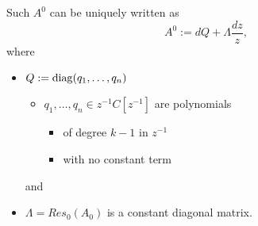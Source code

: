 \begin{paracol}{2}
\begin{defn}
    \begin{rem}
      Such $A^0$ can be uniquely written as
      \[
        A^0:= dQ + \Lambda \frac{dz}{z},
      \]
      where
      \begin{itemize}
        \item $Q := \operatorname{diag}(q_1,\dots ,q_n)$
          \begin{itemize}
            \item $q_1,\dots ,q_n\in z^{-1}C[z^{-1}]$ are polynomials
              \begin{itemize}
                \item of degree $k-1$ in $z^{-1}$
                \item with no constant term
              \end{itemize}
          \end{itemize}
          and
        \item $\Lambda = Res_0(A_0)$ is a constant diagonal matrix.
      \end{itemize}
    \end{rem}
  \end{defn}
\end{paracol}

